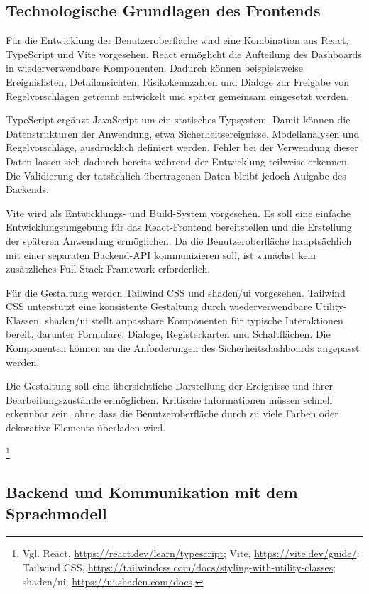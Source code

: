 \subsection{Technologische Grundlagen des Frontends}

Für die Entwicklung der Benutzeroberfläche wird eine Kombination
aus React, TypeScript und Vite vorgesehen. React ermöglicht die
Aufteilung des Dashboards in wiederverwendbare Komponenten.
Dadurch können beispielsweise Ereignislisten, Detailansichten,
Risikokennzahlen und Dialoge zur Freigabe von Regelvorschlägen
getrennt entwickelt und später gemeinsam eingesetzt werden.

TypeScript ergänzt JavaScript um ein statisches Typsystem. Damit
können die Datenstrukturen der Anwendung, etwa Sicherheitsereignisse,
Modellanalysen und Regelvorschläge, ausdrücklich definiert werden.
Fehler bei der Verwendung dieser Daten lassen sich dadurch bereits
während der Entwicklung teilweise erkennen. Die Validierung der
tatsächlich übertragenen Daten bleibt jedoch Aufgabe des Backends.

Vite wird als Entwicklungs- und Build-System vorgesehen. Es soll
eine einfache Entwicklungsumgebung für das React-Frontend
bereitstellen und die Erstellung der späteren Anwendung ermöglichen.
Da die Benutzeroberfläche hauptsächlich mit einer separaten
Backend-API kommunizieren soll, ist zunächst kein zusätzliches
Full-Stack-Framework erforderlich.

Für die Gestaltung werden Tailwind CSS und shadcn/ui vorgesehen.
Tailwind CSS unterstützt eine konsistente Gestaltung durch
wiederverwendbare Utility-Klassen. shadcn/ui stellt anpassbare
Komponenten für typische Interaktionen bereit, darunter Formulare,
Dialoge, Registerkarten und Schaltflächen. Die Komponenten können
an die Anforderungen des Sicherheitsdashboards angepasst werden.

Die Gestaltung soll eine übersichtliche Darstellung der Ereignisse
und ihrer Bearbeitungszustände ermöglichen. Kritische Informationen
müssen schnell erkennbar sein, ohne dass die Benutzeroberfläche
durch zu viele Farben oder dekorative Elemente überladen wird.

\footnote{Vgl. React, \url{https://react.dev/learn/typescript};
Vite, \url{https://vite.dev/guide/};
Tailwind CSS, \url{https://tailwindcss.com/docs/styling-with-utility-classes};
shadcn/ui, \url{https://ui.shadcn.com/docs}.}

\subsection{Backend und Kommunikation mit dem Sprachmodell}


